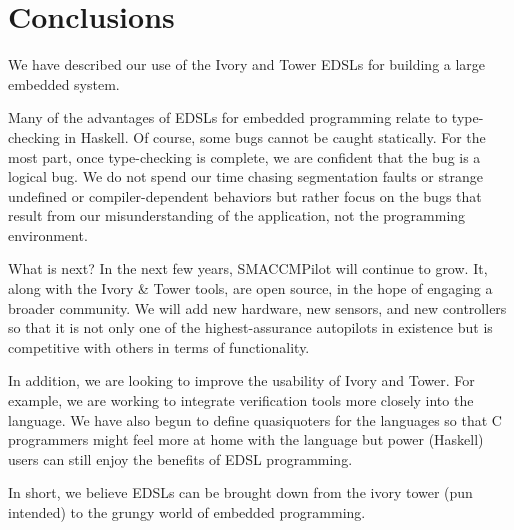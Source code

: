 \section{Conclusions}
\label{sec:conclusions}

We have described our use of the Ivory and Tower EDSLs for building a large
embedded system.

Many of the advantages of EDSLs for embedded programming relate to type-checking
in Haskell.  Of course, some bugs cannot be caught statically.  For the most part,
once type-checking is complete, we are confident that the bug is a logical bug.
We do not spend our time chasing segmentation faults or strange undefined or
compiler-dependent behaviors but rather focus on the bugs that result from our
misunderstanding of the application, not the programming environment.

What is next?  In the next few years, SMACCMPilot will continue to grow. It,
along with the Ivory \& Tower tools, are open source, in the hope of engaging a
broader community.
We will add new hardware, new sensors, and new controllers so that it is not
only one of the highest-assurance autopilots in existence but is competitive
with others in terms of functionality.

In addition, we are looking to improve the usability of Ivory and Tower.  For
example, we are working to integrate verification tools more closely into the
language.  We have also begun to define quasiquoters for the languages so that
C programmers might feel more at home with the language but power (Haskell)
users can still enjoy the benefits of EDSL programming.

In short, we believe EDSLs can be brought down from the ivory tower (pun
intended) to the grungy world of embedded programming.






